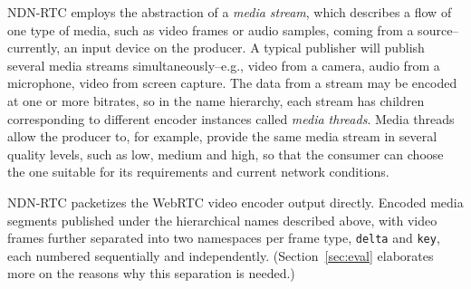 \documentclass{icn/sig-alternate-2013} %
\newcommand{\ndnrtcName}{NDN-RTC} %
\begin{document}
\ndnrtcName{} employs the abstraction of a \textit{media stream}, which describes a flow of one type of media, such as video frames or audio samples, coming from a source--currently, an input device on the producer.
A typical publisher will publish several media streams simultaneously--e.g., video from a camera, audio from a microphone, video from screen capture.  The data from a stream may be encoded at one or more bitrates, so in the name hierarchy, each stream has children corresponding to different encoder instances called \textit{media threads}. Media threads allow the producer to, for example, provide the same media stream in several quality levels, such as low, medium and high, so that the consumer can choose the one suitable for its requirements and current network conditions.

\ndnrtcName{} packetizes the WebRTC video encoder output directly. Encoded media segments published under the hierarchical names described above, with video frames further separated into two namespaces per frame type, \texttt{delta} and \texttt{key}, each numbered sequentially and independently. (Section~\ref{sec:eval} elaborates more on the reasons why this separation is needed.) 

\end{document}
